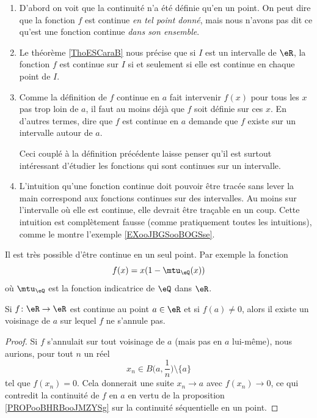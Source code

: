 \begin{enumerate}
	\item D'abord on voit que la continuité n'a été définie qu'en un point. On peut dire que la fonction \( f\) est continue \emph{en tel point donné}, mais nous n'avons pas dit ce qu'est une fonction continue \emph{dans son ensemble}.

	\item
	      Le théorème \ref{ThoESCaraB} nous précise que si \( I\) est un intervalle de \( \eR\), la fonction \( f\) est continue sur \( I\) si et seulement si elle est continue en chaque point de \( I\).

	\item Comme la définition de \( f\) continue en \( a\) fait intervenir \( f(x)\) pour tous les \( x\) pas trop loin de \( a\), il faut au moins déjà que \( f\) soit définie sur ces \( x\). En d'autres termes, dire que \( f\) est continue en \( a\) demande que \( f\) existe sur un intervalle autour de \( a\).

	      Ceci couplé à la définition précédente laisse penser qu'il est surtout intéressant d'étudier les fonctions qui sont continues sur un intervalle.

	\item L'intuition qu'une fonction continue doit pouvoir être tracée sans lever la main correspond aux fonctions continues sur des intervalles. Au moins sur l'intervalle où elle est continue, elle devrait être traçable en un coup. Cette intuition est complètement fausse (comme pratiquement toutes les intuitions), comme le montre l'exemple \ref{EXooJBGSooBOGSse}.
\end{enumerate}


\begin{example}     \label{EXooJBGSooBOGSse}
	Il est très possible d'être continue en un seul point. Par exemple la fonction
	\begin{equation}
		f(x)=x(1-\mtu_{\eQ}(x))
	\end{equation}
	où \( \mtu_{\eQ}\) est la fonction indicatrice de \( \eQ\) dans \( \eR\).
\end{example}

\begin{proposition}     \label{PROPooUBUAooNIxjfg}
	Si \( f\colon \eR\to \eR\) est continue au point \( a\in \eR\) et si \( f(a)\neq 0\), alors il existe un voisinage de \( a\) sur lequel \( f\) ne s'annule pas.
\end{proposition}

\begin{proof}
	Si \( f \) s'annulait sur tout voisinage de \( a\) (mais pas en \( a\) lui-même), nous aurions, pour tout \( n\) un réel
	\begin{equation}
		x_n\in B\big( a,\frac{1}{ n } \big)\setminus\{ a \}
	\end{equation}
	tel que \( f(x_n)=0\). Cela donnerait une suite \( x_n\to a\) avec \( f(x_n)\to 0\), ce qui contredit la continuité de \( f\) en \( a\) en vertu de la proposition \ref{PROPooBHRBooJMZYSg} sur la continuité séquentielle en un point.
\end{proof}

